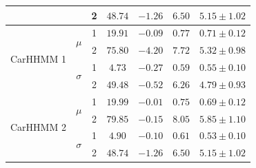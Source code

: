 \begin{table}
{\begin{tabular}{ccccccc}
                           &                               & 2                             & $48.74$                         & $-1.26$                     & $6.50$                             & $5.15 \pm 1.02$                             \\ \hline
\multirow{4}{*}{CarHHMM 1} & \multirow{2}{*}{$\mu$}        & 1                             & $19.91$                         & $-0.09$                     & $0.77$                             & $0.71 \pm 0.12$                             \\
                           &                               & 2                             & $75.80$                         & $-4.20$                     & $7.72$                             & $5.32 \pm 0.98$                             \\
                           & \multirow{2}{*}{$\sigma$}     & 1                             & $4.73$                         & $-0.27$                     & $0.59$                             & $0.55 \pm 0.10$                             \\
                           &                               & 2                             & $49.48$                         & $-0.52$                     & $6.26$                             & $4.79 \pm 0.93$                             \\ \hline
\multirow{4}{*}{CarHHMM 2} & \multirow{2}{*}{$\mu$}        & 1                             & $19.99$                         & $-0.01$                     & $0.75$                             & $0.69 \pm 0.12$                             \\
                           &                               & 2                             & $79.85$                         & $-0.15$                     & $8.05$                             & $5.85 \pm 1.10$                             \\
                           & \multirow{2}{*}{$\sigma$}     & 1                             & $4.90$                         & $-0.10$                     & $0.61$                             & $0.53 \pm 0.10$                             \\
                           &                               & 2                             & $48.74$                         & $-1.26$                     & $6.50$                             & $5.15 \pm 1.02$                             
\end{tabular}
}
\label{table:dive_duration}
\end{table}


